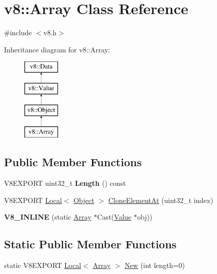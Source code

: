 \hypertarget{classv8_1_1_array}{}\section{v8\+:\+:Array Class Reference}
\label{classv8_1_1_array}


{\ttfamily \#include $<$v8.\+h$>$}

Inheritance diagram for v8\+:\+:Array\+:\begin{figure}[H]
\begin{center}
\leavevmode
\includegraphics[height=4.000000cm]{classv8_1_1_array}
\end{center}
\end{figure}
\subsection*{Public Member Functions}
\begin{DoxyCompactItemize}
\item 
\hypertarget{classv8_1_1_array_a3e56e8707385ea9d6ca515ef7950670e}{}V8\+E\+X\+P\+O\+R\+T uint32\+\_\+t {\bfseries Length} () const \label{classv8_1_1_array_a3e56e8707385ea9d6ca515ef7950670e}

\item 
V8\+E\+X\+P\+O\+R\+T \hyperlink{classv8_1_1_local}{Local}$<$ \hyperlink{classv8_1_1_object}{Object} $>$ \hyperlink{classv8_1_1_array_ac78a0168b8612bcccd789497fd01b2ad}{Clone\+Element\+At} (uint32\+\_\+t index)
\item 
\hypertarget{classv8_1_1_array_aa5c59906471b78b58332eefad21727d6}{}{\bfseries V8\+\_\+\+I\+N\+L\+I\+N\+E} (static \hyperlink{classv8_1_1_array}{Array} $\ast$Cast(\hyperlink{classv8_1_1_value}{Value} $\ast$obj))\label{classv8_1_1_array_aa5c59906471b78b58332eefad21727d6}

\end{DoxyCompactItemize}
\subsection*{Static Public Member Functions}
\begin{DoxyCompactItemize}
\item 
static V8\+E\+X\+P\+O\+R\+T \hyperlink{classv8_1_1_local}{Local}$<$ \hyperlink{classv8_1_1_array}{Array} $>$ \hyperlink{classv8_1_1_array_aabdb62437fce8c3769e69bbf44682066}{New} (int length=0)
\end{DoxyCompactItemize}


